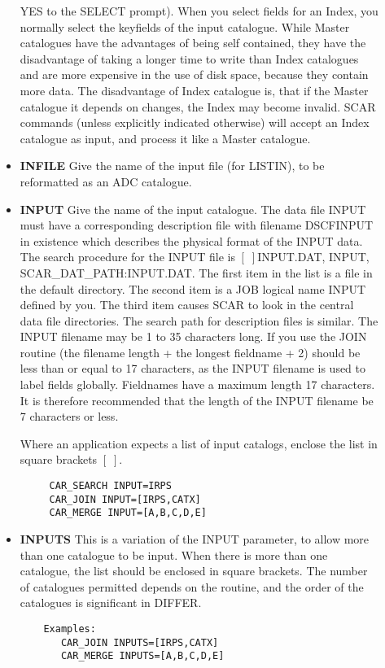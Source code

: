 \begin{description}
\begin{itemize}
YES to the SELECT prompt). 
When you select fields for an Index, you normally select the keyfields of the 
input catalogue.
While Master catalogues have the advantages of being self contained, they have 
the disadvantage of taking a longer time to write than Index catalogues and 
are more expensive in the use of disk space, because they contain more data.
The disadvantage of Index catalogue is, that if the Master catalogue it 
depends on changes, the Index may become invalid.
SCAR commands (unless explicitly indicated otherwise) will accept an Index 
catalogue as input, and process it like a Master catalogue.
\item{\bf INFILE} Give the name of the input file (for LISTIN), to be 
reformatted as an ADC catalogue.
\item{\bf INPUT} Give the name of the input catalogue.
The data file INPUT must have a corresponding description file
with filename DSCFINPUT in existence which describes the physical
format of the INPUT data.
The search procedure for the INPUT file is $[\;]$INPUT.DAT, INPUT,
SCAR\_DAT\_PATH:INPUT.DAT.  
The first item in the list is a file in the default directory.  
The second item is a JOB logical name INPUT defined by you.
The third item causes SCAR to look in the central data file directories.
The search path for description files is similar.
The INPUT filename may be 1 to 35 characters long.  
If you use the JOIN routine (the filename length + the longest 
fieldname + 2) should be less than or equal to 17 characters, as the INPUT 
filename is used to label fields globally.  
Fieldnames have a maximum length 17 characters.  
It is therefore recommended that the length of the INPUT filename be 7 
characters or less. 

Where an application expects a list of input catalogs, enclose the
list in square brackets $[\;]$.
\begin{verbatim}
     CAR_SEARCH INPUT=IRPS
     CAR_JOIN INPUT=[IRPS,CATX]
     CAR_MERGE INPUT=[A,B,C,D,E]
\end{verbatim}
\item{\bf INPUTS} This is a variation of the INPUT parameter, to allow
more than one catalogue to be input.
When there is more than one catalogue, the list should be enclosed in
square brackets.
The number of catalogues permitted depends on the routine, and the order
of the catalogues is significant in DIFFER.
\begin{verbatim}
    Examples:
       CAR_JOIN INPUTS=[IRPS,CATX]
       CAR_MERGE INPUTS=[A,B,C,D,E]


\end{verbatim}
\end{itemize}
\end{description}
